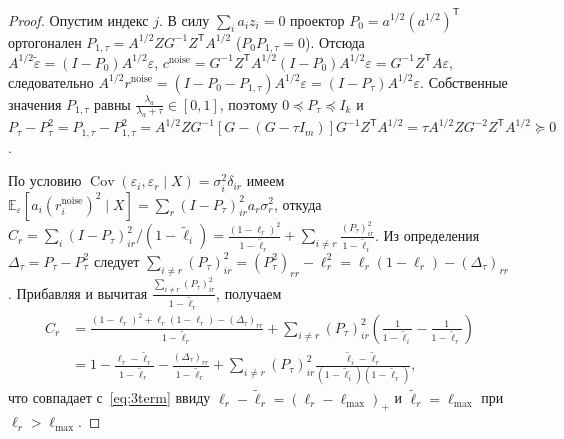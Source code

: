 \documentclass[11pt,a4paper]{article}
\numberwithin{equation}{section}
\theoremstyle{definition}
\theoremstyle{remark}
\newcommand{\E}{\mathbb{E}}
\newcommand{\Cov}{\operatorname{Cov}}
\newcommand{\T}{^{\mathsf T}}
\begin{document}
\begin{proof}
Опустим индекс $j$. В силу $\sum_i a_i z_i = 0$ проектор $P_0 = a^{1/2}(a^{1/2})\T$ ортогонален
$P_{1,\tau} = A^{1/2} Z G^{-1} Z\T A^{1/2}$ ($P_0 P_{1,\tau} = 0$).
Отсюда $A^{1/2} \tilde\varepsilon = (I - P_0) A^{1/2} \varepsilon$,
$c^{\mathrm{noise}} = G^{-1} Z\T A^{1/2} (I - P_0) A^{1/2} \varepsilon = G^{-1} Z\T A \varepsilon$,
следовательно $A^{1/2} r^{\mathrm{noise}} = (I - P_0 - P_{1,\tau}) A^{1/2} \varepsilon = (I - P_\tau) A^{1/2} \varepsilon$.
Собственные значения $P_{1,\tau}$ равны $\frac{\lambda_a}{\lambda_a + \tau} \in [0, 1]$,
поэтому $0 \preceq P_\tau \preceq I_k$ и
$P_\tau - P_\tau^2 = P_{1,\tau} - P_{1,\tau}^2 = A^{1/2} Z G^{-1}[G - (G - \tau I_m)] G^{-1} Z\T A^{1/2} = \tau A^{1/2} Z G^{-2} Z\T A^{1/2} \succeq 0$.

По условию $\Cov(\varepsilon_i, \varepsilon_r \mid X) = \sigma_i^2 \delta_{ir}$ имеем
$\E_\varepsilon[a_i (r_i^{\mathrm{noise}})^2 \mid X] = \sum_r (I - P_\tau)_{ir}^2 a_r \sigma_r^2$, откуда
$C_r = \sum_i (I - P_\tau)_{ir}^2 / (1 - \tilde\ell_i) = \frac{(1 - \ell_r)^2}{1 - \tilde\ell_r} + \sum_{i \ne r} \frac{(P_\tau)_{ir}^2}{1 - \tilde\ell_i}$.
Из определения $\Delta_\tau = P_\tau - P_\tau^2$ следует
$\sum_{i \ne r} (P_\tau)_{ir}^2 = (P_\tau^2)_{rr} - \ell_r^2 = \ell_r(1 - \ell_r) - (\Delta_\tau)_{rr}$.
Прибавляя и вычитая $\frac{\sum_{i \ne r} (P_\tau)_{ir}^2}{1 - \tilde\ell_r}$, получаем
\begin{align*}
  C_r &= \frac{(1 - \ell_r)^2 + \ell_r(1 - \ell_r) - (\Delta_\tau)_{rr}}{1 - \tilde\ell_r}
        + \sum_{i \ne r} (P_\tau)_{ir}^2 \left(\frac{1}{1-\tilde\ell_i} - \frac{1}{1-\tilde\ell_r}\right) \\
      &= 1 - \frac{\ell_r - \tilde\ell_r}{1 - \tilde\ell_r} - \frac{(\Delta_\tau)_{rr}}{1 - \tilde\ell_r}
        + \sum_{i \ne r} (P_\tau)_{ir}^2 \frac{\tilde\ell_i - \tilde\ell_r}{(1-\tilde\ell_i)(1-\tilde\ell_r)},
\end{align*}
что совпадает с~\eqref{eq:3term} ввиду $\ell_r - \tilde\ell_r = (\ell_r - \ell_{\max})_+$ и
$\tilde\ell_r = \ell_{\max}$ при $\ell_r > \ell_{\max}$.


\end{proof}
\end{document}
